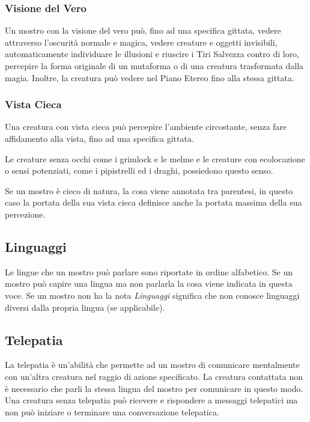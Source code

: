 \begin{multicols}{2}
\subsubsection{Visione del Vero}

Un mostro con la visione del vero può, fino ad una specifica gittata, vedere attraverso l'oscurità normale e magica, vedere creature e oggetti invisibili, automaticamente individuare le illusioni e riuscire i Tiri Salvezza contro di loro, percepire la forma originale di un mutaforma o di una creatura trasformata dalla magia. Inoltre, la creatura può vedere nel Piano Etereo fino alla stessa gittata.

\subsubsection{Vista Cieca}

Una creatura con vista cieca può percepire l'ambiente circostante, senza fare affidamento alla vista, fino ad una specifica gittata.

Le creature senza occhi come i grimlock e le melme e le creature con ecolocazione o sensi potenziati, come i pipistrelli ed i draghi, possiedono questo senso.

Se un mostro è cieco di natura, la cosa viene annotata tra parentesi, in questo caso la portata della sua vista cieca definisce anche la portata massima della sua percezione.

\subsection{Linguaggi}

Le lingue che un mostro può parlare sono riportate in ordine alfabetico. Se un mostro può capire una lingua ma non parlarla la cosa viene indicata in questa voce. Se un mostro non ha la nota \emph{Linguaggi} significa che non conosce linguaggi diversi dalla propria lingua (se applicabile).

\subsection{Telepatia}

La telepatia è un'abilità che permette ad un mostro di comunicare mentalmente con un'altra creatura nel raggio di azione specificato. La creatura contattata non è necessario che parli la stessa lingua del mostro per comunicare in questo modo. Una creatura senza telepatia può ricevere e rispondere a messaggi telepatici ma non può iniziare o terminare una conversazione telepatica.


\end{multicols}
